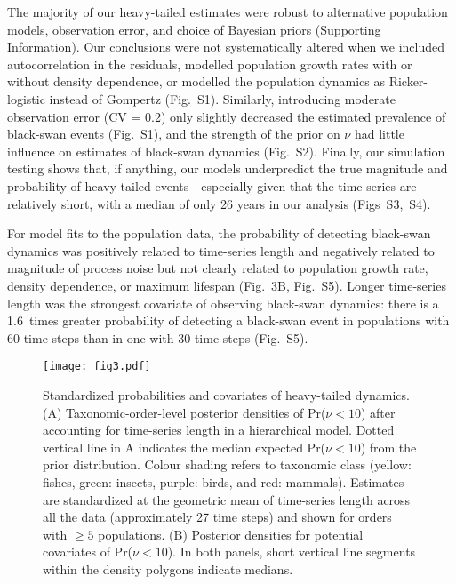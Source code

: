 \documentclass[9pt,twocolumn,twoside]{pnas-new}
\newcommand{\figalt}{{1}}
\newcommand{\figaltpriors}{{2}}
\newcommand{\figsimnu}{{3}}
\newcommand{\figsimprob}{{4}}
\newcommand{\figcorrelates}{{5}}
\newcommand{\pIncHeavyNThirtyNSixty}{1.6}
\begin{document}
The majority of our heavy-tailed estimates were robust to alternative
population models, observation error, and choice of Bayesian priors (Supporting Information).
Our conclusions were not systematically altered when we included autocorrelation
in the residuals, modelled population growth rates with or without
density dependence, or modelled the population dynamics as Ricker-logistic
instead of Gompertz (Fig.~S\figalt). Similarly, introducing moderate
observation error (CV = 0.2) only slightly decreased the estimated prevalence
of black-swan events (Fig.~S\figalt), and the strength of the prior on
\(\nu\) had little influence on estimates of black-swan dynamics
(Fig.~S\figaltpriors). Finally, our simulation testing shows that, if
anything, our models underpredict the true magnitude and probability of
heavy-tailed events---especially given that the time series are relatively short,
with a median of only 26
years in our analysis (Figs~S\figsimnu,~S\figsimprob).


For model fits to the population data, the probability of detecting black-swan
dynamics was positively related to time-series length and negatively related to
magnitude of process noise but not clearly related to population growth rate,
density dependence, or maximum lifespan (Fig.~3B, Fig.~S\figcorrelates).
Longer time-series length was the strongest covariate of observing black-swan
dynamics: there is a \pIncHeavyNThirtyNSixty\ times greater probability of detecting a black-swan
event in populations with 60 time steps than in one with 30 time steps
(Fig.~S\figcorrelates).

\begin{figure}[htb]
\centering
\texttt{[image: fig3.pdf]}
\caption{Standardized probabilities and covariates of heavy-tailed
dynamics. (A) Taxonomic-order-level posterior densities of Pr(\(\nu
< 10\)) after accounting for time-series length in a hierarchical model. Dotted
vertical line in A indicates the median expected Pr(\(\nu < 10\)) from the
prior distribution. Colour shading refers to taxonomic class (yellow: fishes,
green: insects, purple: birds, and red: mammals). Estimates are standardized at
the geometric mean of time-series length across all the data (approximately 27
time steps) and shown for orders with \(\ge 5\) populations. (B)
Posterior densities for potential covariates of Pr(\(\nu < 10\)). In both
panels, short vertical line segments within the density polygons indicate
medians.
}
\label{fig:3}
\end{figure}
\end{document}
